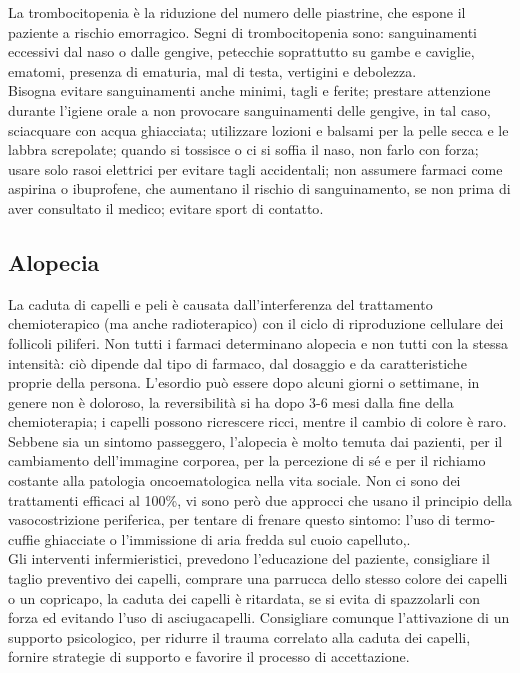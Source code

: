 La trombocitopenia è la riduzione del numero delle piastrine, che espone il paziente a rischio emorragico. 
Segni di trombocitopenia sono: sanguinamenti eccessivi dal naso o dalle gengive, petecchie soprattutto su 
gambe e caviglie, ematomi, presenza di ematuria, mal di testa, vertigini e debolezza\cite{LLSLOWCELLS}.\\
Bisogna evitare sanguinamenti anche minimi, tagli e ferite; prestare attenzione durante l’igiene orale a non 
provocare sanguinamenti delle gengive, in tal caso, sciacquare con acqua ghiacciata; utilizzare lozioni e balsami 
per la pelle secca e le labbra screpolate; quando si tossisce o ci si soffia il naso, non farlo con forza; 
usare solo rasoi elettrici per evitare tagli accidentali; non assumere farmaci come aspirina o ibuprofene, 
che aumentano il rischio di sanguinamento, se non prima di aver consultato il medico; evitare sport di 
contatto\cite{AMERICANPLATELET}.

\subsection{Alopecia}

La caduta di capelli e peli è causata dall’interferenza del trattamento chemioterapico (ma anche radioterapico) con 
il ciclo di riproduzione cellulare dei follicoli piliferi. Non tutti i farmaci determinano alopecia e non tutti con 
la stessa intensità: ciò dipende dal tipo di farmaco, dal dosaggio e da caratteristiche proprie della persona. 
L’esordio può essere dopo alcuni giorni o settimane, in genere non è doloroso, la reversibilità si ha dopo 3-6 mesi 
dalla fine della chemioterapia; i capelli possono ricrescere ricci, mentre il cambio di colore è raro.\\ 
Sebbene sia un sintomo passeggero, l’alopecia è molto temuta dai pazienti, per il cambiamento dell’immagine corporea, 
per la percezione di sé e per il richiamo costante alla patologia oncoematologica nella vita sociale\cite{HAIRLOSS2}. 
Non ci sono dei trattamenti efficaci al 100\%, vi sono però due approcci che usano il 
principio della vasocostrizione periferica, per tentare di frenare questo sintomo:
l’uso di termo-cuffie ghiacciate o l’immissione di aria fredda sul cuoio capelluto\cite{ALOPECIA},\cite{HAIRLOSS}.\\
Gli interventi infermieristici, prevedono l’educazione del paziente, consigliare il taglio preventivo dei capelli, 
comprare una parrucca dello stesso colore dei capelli o un copricapo, la caduta dei capelli è ritardata, se si evita 
di spazzolarli con forza ed evitando l’uso di asciugacapelli. Consigliare comunque l’attivazione di un supporto 
psicologico, per ridurre il trauma correlato alla caduta dei capelli, fornire strategie di supporto e favorire 
il processo di accettazione\cite{ALOPECIA}.


